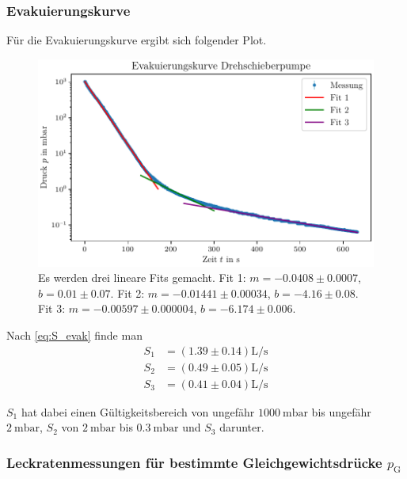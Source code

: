 \subsubsection{Evakuierungskurve}

Für die Evakuierungskurve ergibt sich folgender Plot.

\begin{figure}[H]
    \centering
    \includegraphics[width=\textwidth]{plots/DP_Evakuierungskurve.pdf}
    \caption{Es werden drei lineare Fits gemacht. Fit 1: $m = \num{-0.0408} \pm \num{0.0007}$, $b = \num{0.01} \pm \num{0.07}$. Fit 2: $m = \num{-0.01441} \pm \num{0.00034}$, $b = \num{-4.16} \pm \num{0.08}$. Fit 3: $m = \num{-0.00597} \pm \num{0.000004}$, $b = \num{-6.174} \pm \num{0.006}$.}
    \label{fig:DP_evak}
\end{figure}

Nach \eqref{eq:S_evak} finde man
\begin{align}
    S_1 &= (\num{1.39} \pm \num{0.14}) \si{\liter\per\second} \\
    S_2 &= (\num{0.49} \pm \num{0.05}) \si{\liter\per\second} \\
    S_3 &= (\num{0.41} \pm \num{0.04}) \si{\liter\per\second} 
\end{align}

$S_1$ hat dabei einen Gültigkeitsbereich von ungefähr $\SI{1000}{\milli\bar}$ bis ungefähr $\SI{2}{\milli\bar}$, $S_2$ von $\SI{2}{\milli\bar}$ bis $\SI{0.3}{\milli\bar}$ und $S_3$ darunter.

\subsubsection{Leckratenmessungen für bestimmte Gleichgewichtsdrücke $p_\text{G}$}

